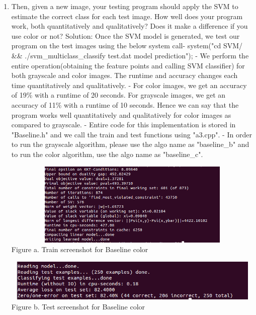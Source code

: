 \documentclass{article}
\begin{document}
\begin{enumerate}
		
		\item Then, given a new image, your testing program should apply the SVM to estimate the correct class for each test image. How well does your program work, both quantitatively and qualitatively? Does it make a difference if you use color or not? \newline
		Solution: Once the SVM model is generated, we test our program on the test images using the below system call- \newline \newline 
		system("cd SVM/ \&\& ./svm\_multiclass\_classify test.dat model prediction");\newline \newline
		- We perform the entire operation(obtaining the feature points and calling SVM classifier) for both grayscale and color images. The runtime and accuracy changes each time quantitatively and qualitatively. \newline
		- For color images, we get an accuracy of 19\% with a runtime of 20 seconds. For grayscale images, we get an accuracy of 11\% with a runtime of 10 seconds. Hence we can say that the program works well quantitatively and qualitatively for color images as compared to grayscale. \newline
		- Entire code for this implementation is stored in "Baseline.h" and we call the train and test functions using "a3.cpp". \newline
		- In order to run the grayscale algorithm, please use the algo name as "baseline\_b" and to run the color algorithm, use the algo name as "baseline\_c". \newline
		
		\begin{center}
			\includegraphics[width=14cm, height=4cm]{train_baseline_c.png} \\
			Figure a. Train screenshot for Baseline color
		\end{center}
		
		\begin{center}
			\includegraphics[width=14cm, height=2cm]{test_baseline_c.png} \\
			Figure b. Test screenshot for Baseline color
		\end{center}
		

\end{enumerate}
\end{document}
